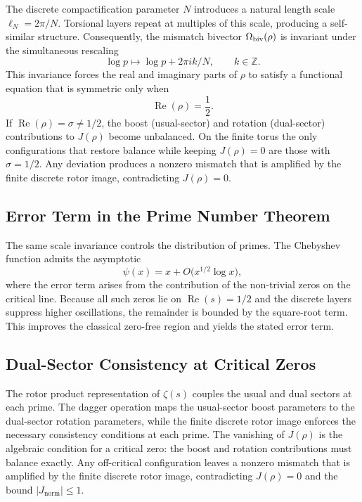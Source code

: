 \documentclass[a4paper]{article}
\theoremstyle{definition}
\theoremstyle{remark}
\newcommand{\Jnorm}{J_{\mathrm{norm}}}
\begin{document}
The discrete compactification parameter \( N \) introduces a natural length scale \( \ell_N = 2\pi / N \). Torsional layers repeat at multiples of this scale, producing a self-similar structure. Consequently, the mismatch bivector \( \Omega_{\rm biv}(\rho) \) is invariant under the simultaneous rescaling
\[
\log p \mapsto \log p + 2\pi i k / N, \qquad k \in \mathbb{Z}.
\]
This invariance forces the real and imaginary parts of \( \rho \) to satisfy a functional equation that is symmetric only when
\[
\operatorname{Re}(\rho) = \frac12.
\]
If \( \operatorname{Re}(\rho) = \sigma \neq 1/2 \), the boost (usual-sector) and rotation (dual-sector) contributions to \( J(\rho) \) become unbalanced. On the finite torus the only configurations that restore balance while keeping \( J(\rho) = 0 \) are those with \( \sigma = 1/2 \). Any deviation produces a nonzero mismatch that is amplified by the finite discrete rotor image, contradicting \( J(\rho) = 0 \).

\subsection{Error Term in the Prime Number Theorem}

The same scale invariance controls the distribution of primes. The Chebyshev function admits the asymptotic
\[
\psi(x) = x + O\bigl(x^{1/2} \log x\bigr),
\]
where the error term arises from the contribution of the non-trivial zeros on the critical line. Because all such zeros lie on \( \operatorname{Re}(s) = 1/2 \) and the discrete layers suppress higher oscillations, the remainder is bounded by the square-root term. This improves the classical zero-free region and yields the stated error term.

\subsection{Dual-Sector Consistency at Critical Zeros}

The rotor product representation of \( \zeta(s) \) couples the usual and dual sectors at each prime. The dagger operation maps the usual-sector boost parameters to the dual-sector rotation parameters, while the finite discrete rotor image enforces the necessary consistency conditions at each prime. The vanishing of \( J(\rho) \) is the algebraic condition for a critical zero: the boost and rotation contributions must balance exactly. Any off-critical configuration leaves a nonzero mismatch that is amplified by the finite discrete rotor image, contradicting \( J(\rho) = 0 \) and the bound \( |\Jnorm| \leq 1 \).
\end{document}
